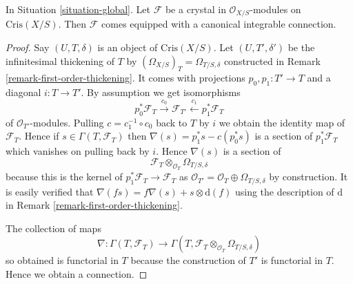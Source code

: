 \begin{lemma}
\label{lemma-automatic-connection}
In Situation \ref{situation-global}.
Let $\mathcal{F}$ be a crystal in $\mathcal{O}_{X/S}$-modules
on $\text{Cris}(X/S)$. Then $\mathcal{F}$ comes equipped with a
canonical integrable connection.
\end{lemma}

\begin{proof}
Say $(U, T, \delta)$ is an object of $\text{Cris}(X/S)$.
Let $(U, T', \delta')$ be the infinitesimal thickening of $T$
by $(\Omega_{X/S})_T = \Omega_{T/S, \delta}$
constructed in Remark \ref{remark-first-order-thickening}.
It comes with projections $p_0, p_1 : T' \to T$
and a diagonal $i : T \to T'$. By assumption we get
isomorphisms
$$
p_0^*\mathcal{F}_T \xrightarrow{c_0}
\mathcal{F}_{T'} \xleftarrow{c_1}
p_1^*\mathcal{F}_T
$$
of $\mathcal{O}_{T'}$-modules. Pulling $c = c_1^{-1} \circ c_0$
back to $T$ by $i$ we obtain the identity map
of $\mathcal{F}_T$. Hence if $s \in \Gamma(T, \mathcal{F}_T)$
then $\nabla(s) = p_1^*s - c(p_0^*s)$ is a section of
$p_1^*\mathcal{F}_T$ which vanishes on pulling back by $i$. Hence
$\nabla(s)$ is a section of
$$
\mathcal{F}_T
\otimes_{\mathcal{O}_T}
\Omega_{T/S, \delta}
$$
because this is the kernel of $p_1^*\mathcal{F}_T \to \mathcal{F}_T$
as $\mathcal{O}_{T'} = \mathcal{O}_T \oplus \Omega_{T/S, \delta}$
by construction. It is easily verified that $\nabla(fs) =
f\nabla(s) + s \otimes \text{d}(f)$ using the description of
$\text{d}$ in Remark \ref{remark-first-order-thickening}.

\medskip\noindent
The collection of maps
$$
\nabla : \Gamma(T, \mathcal{F}_T) \to
\Gamma(T, \mathcal{F}_T \otimes_{\mathcal{O}_T} \Omega_{T/S, \delta})
$$
so obtained is functorial in $T$ because the construction of $T'$
is functorial in $T$. Hence we obtain a connection.


\end{proof}
